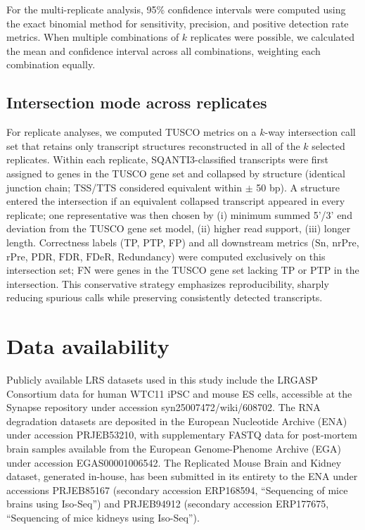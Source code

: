 \documentclass[pdflatex,sn-nature]{sn-jnl}%
\newcommand{\tuscoGeneSet}{TUSCO gene set}
\newcommand{\tuscoMetrics}{TUSCO metrics}
\begin{document}
For the multi-replicate analysis, 95\% confidence intervals were computed using the exact binomial method for sensitivity, precision, and positive detection rate metrics. When multiple combinations of $k$ replicates were possible, we calculated the mean and confidence interval across all combinations, weighting each combination equally.

\subsection{Intersection mode across replicates}

For replicate analyses, we computed \tuscoMetrics{} on a $k$-way intersection call set that retains only transcript structures reconstructed in all of the $k$ selected replicates. Within each replicate, SQANTI3-classified transcripts were first assigned to genes in the \tuscoGeneSet{} and collapsed by structure (identical junction chain; TSS/TTS considered equivalent within $\pm$ 50 bp). A structure entered the intersection if an equivalent collapsed transcript appeared in every replicate; one representative was then chosen by (i) minimum summed 5'/3' end deviation from the \tuscoGeneSet{} model, (ii) higher read support, (iii) longer length. Correctness labels (TP, PTP, FP) and all downstream metrics ($\mathrm{Sn}$, $\mathrm{nrPre}$, $\mathrm{rPre}$, $\mathrm{PDR}$, $\mathrm{FDR}$, $\mathrm{FDeR}$, $\mathrm{Redundancy}$) were computed exclusively on this intersection set; FN were genes in the \tuscoGeneSet{} lacking TP or PTP in the intersection. This conservative strategy emphasizes reproducibility, sharply reducing spurious calls while preserving consistently detected transcripts.


\section{Data availability}

Publicly available LRS datasets used in this study include the LRGASP Consortium data for human WTC11 iPSC and mouse ES cells, accessible at the Synapse repository under accession syn25007472/wiki/608702. The RNA degradation datasets are deposited in the European Nucleotide Archive (ENA) under accession PRJEB53210, with supplementary FASTQ data for post-mortem brain samples available from the European Genome-Phenome Archive (EGA) under accession EGAS00001006542. The Replicated Mouse Brain and Kidney dataset, generated in-house, has been submitted in its entirety to the ENA under accessions PRJEB85167 (secondary accession ERP168594, ``Sequencing of mice brains using Iso-Seq'') and PRJEB94912 (secondary accession ERP177675, ``Sequencing of mice kidneys using Iso-Seq'').
\end{document}
